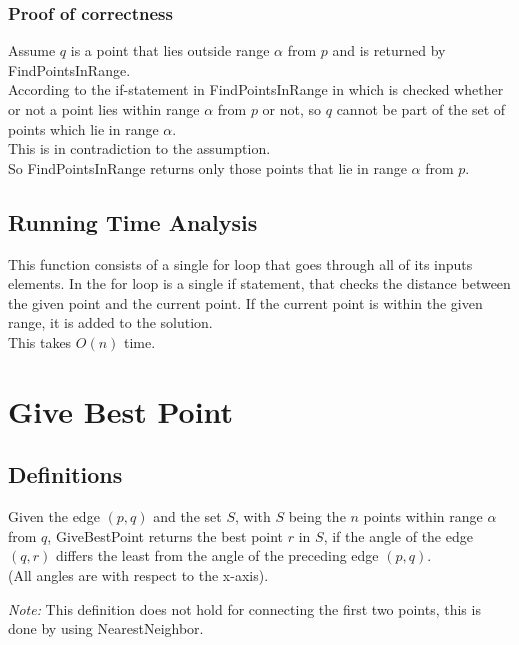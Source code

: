     \subsubsection{Proof of correctness}
    \label{ssub:proof}
      Assume $q$ is a point that lies outside range $\alpha$ from $p$ and is returned by FindPointsInRange.\\
      According to the if-statement in FindPointsInRange in which is checked whether or not a point lies within range $\alpha$ from $p$ or not, so $q$ cannot be part of the set of points which lie in range $\alpha$.\\
      This is in contradiction to the assumption.\\
      So FindPointsInRange returns only those points that lie in range $\alpha$ from $p$.

    \subsection{Running Time Analysis}
    \label{sub:running_time_analysis}
      This function consists of a single for loop that goes through all of its inputs elements. In the for loop is a single if statement, that checks the distance between the given point and the current point. If the current point is within the given range, it is added to the solution. \\
      This takes $O(n)$ time.

  \section{Give Best Point}
  \label{sec:give_best_point}

    \subsection{Definitions}
    \label{sub:definitions}
      \begin{definition} \label{def:gbp}
          Given the edge $(p,q)$ and the set $S$, with $S$ being the $n$ points within range $\alpha$ from $q$, GiveBestPoint returns the best point $r$ in $S$, if the angle of the edge $(q,r)$ differs the least from the angle of the preceding edge $(p,q)$.\\ (All angles are with respect to the x-axis).
      \end{definition}
      \emph{Note:} This definition does not hold for connecting the first two points, this is done by using NearestNeighbor.

